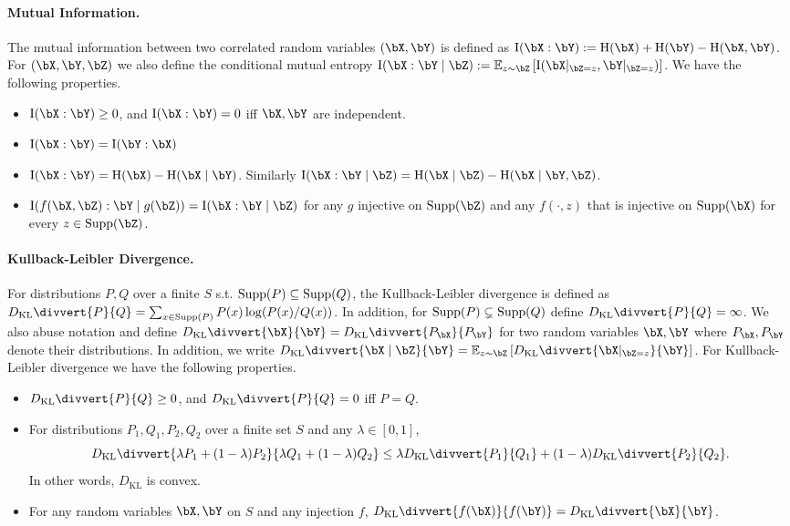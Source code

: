 \documentclass{article}
\newcommand{\KL}{D_{\mathrm{KL}}\divvert}
\DeclarePairedDelimiter{\paren}{(}{)}
\newcommand{\ent}{\mathrm{H}\paren}
\newcommand{\info}{\mathrm{I}\paren}
\begin{document}
\paragraph{Mutual Information.} The mutual information between two correlated random variables $(\bX,\bY)$ is defined as $\info{\bX:\bY}:=\ent{\bX}+\ent{\bY}-\ent{\bX,\bY}$. For $(\bX,\bY,\bZ)$ we also define the conditional mutual entropy $\info{\bX:\bY\mid\bZ}:=\ex[z\sim\bZ]{\info{\bX|_{\bZ=z},\bY|_{\bZ=z}}}$. We have the following properties.
\begin{itemize}
\item 
$\info{\bX:\bY}\ge 0$, and $\info{\bX:\bY}=0$ iff $\bX,\bY$ are independent.
\item 
$\info{\bX:\bY}=\info{\bY:\bX}$
\item 
$\info{\bX:\bY}=\ent{\bX}-\ent{\bX\mid\bY}$. Similarly $\info{\bX:\bY\mid\bZ}=\ent{\bX\mid\bZ}-\ent{\bX\mid\bY,\bZ}$.
\item 
$\info{f(\bX,\bZ):\bY\mid g(\bZ)}=\info{\bX:\bY\mid\bZ}$ for any $g$ injective on $\Supp(\bZ)$ and any $f(\cdot,z)$ that is injective on $\Supp(\bX)$ for every $z\in\Supp(\bZ)$. 
\end{itemize}

\paragraph{Kullback-Leibler Divergence.} For distributions $P,Q$ over a finite $S$ s.t. $\operatorname{Supp}(P)\subseteq \operatorname{Supp}(Q)$, the Kullback-Leibler divergence is defined as $\KL{P}{Q}=\sum_{x\in \Supp(P)}P(x)\log(P(x)/Q(x))$. In addition, for $\operatorname{Supp}(P)\subsetneq \operatorname{Supp}(Q)$ define $\KL{P}{Q}=\infty$. We also abuse notation and define $\KL{\bX}{\bY}=\KL{P_\bX}{P_\bY}$ for two random variables $\bX,\bY$ where $P_{\bX},P_{\bY}$ denote their distributions. In addition, we write $\KL{\bX\mid\bZ}{\bY}=\ex[z\sim\bZ]{\KL{\bX|_{\bZ=z}}{\bY}}$. For Kullback-Leibler divergence we have the following properties. 
\begin{itemize}
\item 
$\KL{P}{Q}\ge 0$, and $\KL{P}{Q}=0$ iff $P=Q$.
\item 
For distributions $P_1,Q_1,P_2,Q_2$ over a finite set $S$ and any $\lambda\in[0,1]$, 
$$\KL{\lambda P_1+(1-\lambda)P_2}{\lambda Q_1 + (1-\lambda) Q_2} \le \lambda \KL{P_1}{Q_1} + (1-\lambda)\KL{P_2}{Q_2}.$$
In other words, $D_\mathrm{KL}$ is convex.
\item 
For any random variables $\bX,\bY$ on $S$ and any injection $f$, $\KL{f(\bX)}{f(\bY)}=\KL{\bX}{\bY}$.
\end{itemize}
\end{document}
